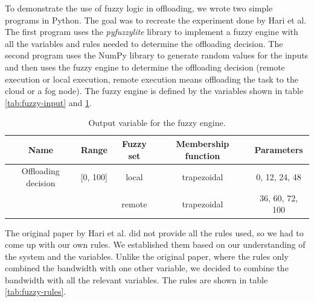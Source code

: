 To demonstrate the use of fuzzy logic in offloading, we wrote two simple programs in Python. The goal was to recreate
the experiment done by Hari et al.\cite{Hari-et-al-2018} The first program uses the \textit{pyfuzzylite}\cite{fuzzylite}
library to implement a fuzzy engine with all the variables and rules needed to determine the offloading decision. The
second program uses the NumPy library to generate random values for the inputs and then uses the fuzzy engine to determine
the offloading decision (remote execution or local execution, remote execution means offloading the task to the cloud or
a fog node). The fuzzy engine is defined by the variables shown in table \ref{tab:fuzzy-input} and \ref{tab:fuzzy-output}.

\begin{table}[H]
  \centering
  \begin{tabular}{|c|c|c|c|c|}
    \hline
    Name                & Range    & Fuzzy set & Membership function & Parameters      \\
    \hline
    Offloading decision & [0, 100] & local     & trapezoidal         & 0, 12, 24, 48   \\
                        &          & remote    & trapezoidal         & 36, 60, 72, 100 \\
    \hline
  \end{tabular}
  \caption{Output variable for the fuzzy engine.}
  \label{tab:fuzzy-output}
\end{table}

The original paper by Hari et al. did not provide all the rules used, so we had to come up with our own rules. We
established them based on our understanding of the system and the variables. Unlike the original paper, where the
rules only combined the bandwidth with one other variable, we decided to combine the bandwidth with all the relevant
variables. The rules are shown in table \ref{tab:fuzzy-rules}.

